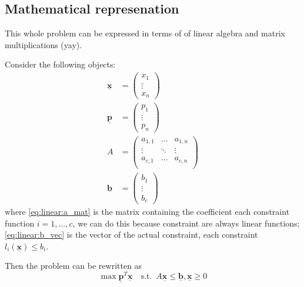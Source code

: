 \documentclass[12pt]{extarticle}
\renewcommand{\vec}[1]{\underline{\mathbf{#1}}}
\begin{document}
\subsection{Mathematical represenation}

This whole problem can be expressed in terms of of linear algebra and matrix multiplications (yay).

Consider the following objects:
\begin{align}
    \vec x & = \begin{pmatrix}
                   x_1    \\
                   \vdots \\
                   x_n
               \end{pmatrix}                        \\
    \vec p & = \begin{pmatrix}
                   p_1    \\
                   \vdots \\
                   p_n
               \end{pmatrix}                        \\
    A      & = \begin{pmatrix}
                   a_{1,1} & \dots  & a_{1, n} \\
                   \vdots  & \ddots & \vdots   \\
                   a_{c,1} & \dots  & a_{c, n} \\
               \end{pmatrix} \label{eq:linear:a_mat} \\
    \vec b & = \begin{pmatrix}
                   b_1    \\
                   \vdots \\
                   b_c
               \end{pmatrix} \label{eq:linear:b_vec}
\end{align}
where \autoref{eq:linear:a_mat} is the matrix containing the coefficient each constraint function $i = 1, \ldots, c$, we can do this because constraint are always linear functions;
\autoref{eq:linear:b_vec} is the vector of the actual constraint, each constraint $l_i(\vec{x}) \leq b_i$.

Then the problem can be rewritten as
\begin{equation}
    \max \vec p^T \vec x \quad \text{s.t.} \enspace A \vec x \leq \vec b, \vec x \geq 0
\end{equation}
\end{document}
